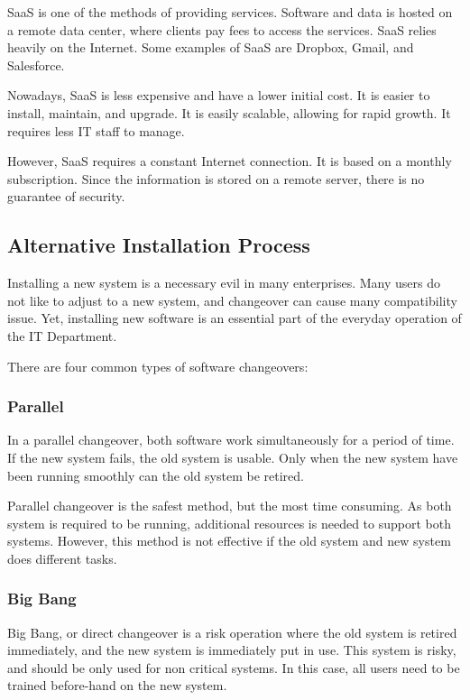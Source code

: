 \documentclass[../notes.tex]{subfiles}
\begin{document}
SaaS is one of the methods of providing services.
Software and data is hosted on a remote data center, where clients pay fees to access the services.
SaaS relies heavily on the Internet.
Some examples of SaaS are Dropbox, Gmail, and Salesforce.

Nowadays, SaaS is less expensive and have a lower initial cost.
It is easier to install, maintain, and upgrade. 
It is easily scalable, allowing for rapid growth.
It requires less IT staff to manage.

However, SaaS requires a constant Internet connection.
It is based on a monthly subscription.
Since the information is stored on a remote server, there is no guarantee of security.

\subsection{Alternative Installation Process}
Installing a new system is a necessary evil in many enterprises.
Many users do not like to adjust to a new system, and changeover can cause many compatibility issue.
Yet, installing new software is an essential part of the everyday operation of the IT Department.

There are four common types of software changeovers:

\subsubsection{Parallel}
In a parallel changeover, both software work simultaneously for a period of time.
If the new system fails, the old system is usable.
Only when the new system have been running smoothly can the old system be retired.

Parallel changeover is the safest method, but the most time consuming.
As both system is required to be running, additional resources is needed to support both systems.
However, this method is not effective if the old system and new system does different tasks.

\subsubsection{Big Bang}
Big Bang, or direct changeover is a risk operation where the old system is retired immediately, and the new system is immediately put in use.
This system is risky, and should be only used for non critical systems.
In this case, all users need to be trained before-hand on the new system.
\end{document}
